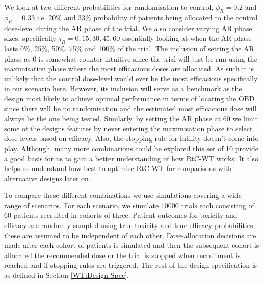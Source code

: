 We look at two different probabilities for randomisation to control, $\phi_R = 0.2$ and $\phi_R = 0.33$ i.e. 20\% and 33\% probability of patients being allocated to the control dose-level during the AR phase of the trial. We also consider varying AR phase sizes, specifically $j_R = 0, 15, 30, 45 ,60$ essentially looking at when the AR phase lasts 0\%, 25\%, 50\%, 75\% and 100\% of the trial. The inclusion of setting the AR phase as 0 is somewhat counter-intuitive since the trial will just be run using the maximisation phase where the most efficacious doses are allocated. As such it is unlikely that the control dose-level would ever be the most efficacious specifically in our scenario here. However, its inclusion will serve as a benchmark as the design most likely to achieve optimal performance in terms of locating the OBD since there will be no randomisation and the estimated most efficacious dose will always be the one being tested. Similarly, by setting the AR phase at 60 we limit some of the designs features by never entering the maximisation phase to select dose levels based on efficacy. Also, the stopping rule for futility doesn't come into play. Although, many more combinations could be explored this set of 10 provide a good basis for us to gain a better understanding of how RtC-WT works. It also helps us understand how best to optimise RtC-WT for comparisons with alternative designs later on.  

To compare these different combinations we use simulations covering a wide range of scenarios. For each scenario, we simulate 10000 trials each consisting of 60 patients recruited in cohorts of three. Patient outcomes for toxicity and efficacy are randomly sampled using true toxicity and true efficacy probabilities, these are assumed to be independent of each other. Dose-allocation decisions are made after each cohort of patients is simulated and then the subsequent cohort is allocated the recommended dose or the trial is stopped when recruitment is reached and if stopping rules are triggered. The rest of the design specification is as defined in Section \ref{WT:Design-Spec}. 


